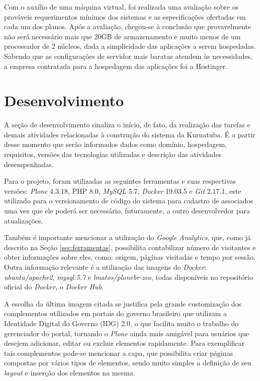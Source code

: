 Com o auxílio de uma máquina virtual, foi realizada uma avaliação sobre os prováveis requerimentos mínimos dos sistemas e as especificações ofertadas em cada um dos planos. Após a avaliação, chegou-se à conclusão que provavelmente não será necessário mais que 20GB de armazenamento e muito menos de um processador de 2 núcleos, dada a simplicidade das aplicações a serem hospedadas. Sabendo que as configurações de servidor mais baratas atendem às necessidades, a empresa contratada para a hospedagem das aplicações foi a Hostinger.   

\hspace{2.5cm}
\section{Desenvolvimento}
\label{sec:desenvolvimento}

\hspace{2.5cm}

A seção de desenvolvimento sinaliza o início, de fato, da realização das tarefas e demais atividades relacionadas à construção do sistema da Kuruatuba. É a partir desse momento que serão informados dados como domínio, hospedagem, requisitos, versões das tecnologias utilizadas e descrição das atividades desempenhadas.

Para o projeto, foram utilizadas as seguintes ferramentas e suas respectivas versões: \textit{Plone} 4.3.18, PHP 8.0, \textit{MySQL} 5.7, \textit{Docker} 19.03.5 e \textit{Git} 2.17.1, este utilizado para o versionamento de código do sistema para cadastro de associados uma vez que ele poderá ser necessário, futuramente, a outro desenvolvedor para atualizações. 

Também é importante mencionar a utilização do \textit{Google Analytics}, que, como já descrito na Seção \ref{sec:ferramentas}, possibilita contabilizar número de visitantes e obter informações sobre eles, como: origem, páginas visitadas e tempo por sessão. Outra informação relevante é a utilização das imagens do \textit{Docker}: \textit{ubuntu/apache2}, \textit{mysql:5.7} e \textit{lmatos/plonebr-zeo}, todas disponíveis no repositório oficial do \textit{Docker}, o \textit{Docker Hub}. 

A escolha da última imagem citada se justifica pela grande customização dos complementos utilizados em portais do governo brasileiro que utilizam a Identidade Digital do Governo (IDG) 2.0, o que facilita muito o trabalho do gerenciador do portal, tornando o \textit{Plone} ainda mais amigável para usuários que desejem adicionar, editar ou excluir elementos rapidamente. Para exemplificar tais complementos pode-se mencionar a capa, que possibilita criar páginas compostas por vários tipos de elementos, sendo muito simples a definição de seu \textit{layout} e inserção dos elementos na mesma.  

